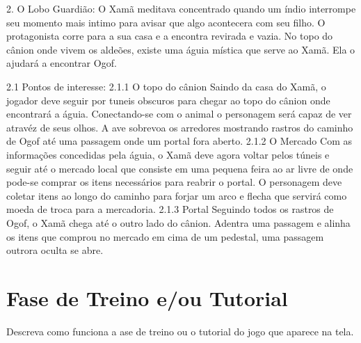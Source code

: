     2. O Lobo Guardião:
   O Xamã meditava concentrado quando um índio interrompe seu momento mais intimo para avisar que algo acontecera com seu filho. O protagonista corre para a sua casa e a encontra revirada e vazia. 
   No topo do cânion onde vivem os aldeões, existe uma águia mística que serve ao Xamã. Ela o ajudará a encontrar Ogof.
   
             2.1 Pontos de interesse: 
             	2.1.1 O topo do cânion
                	Saindo da casa do Xamã, o jogador deve seguir por tuneis obscuros para chegar ao topo do cânion onde encontrará a águia. Conectando-se com o animal o personagem será capaz de ver atravéz de seus olhos. A ave sobrevoa os arredores mostrando rastros do caminho de Ogof até uma passagem onde um portal fora aberto.
                 2.1.2 O Mercado
                 	Com as informações concedidas pela águia, o Xamã deve agora voltar pelos túneis e seguir até o mercado local que consiste em uma pequena feira ao ar livre de onde pode-se comprar os itens necessários para reabrir o portal. 
                    O personagem deve coletar itens ao longo do caminho para forjar um arco e flecha que servirá como moeda de troca para a mercadoria. 
               2.1.3 Portal
               	   Seguindo todos os rastros de Ogof, o Xamã chega até o outro lado do cânion. Adentra uma passagem e alinha os itens que comprou no mercado em cima de um pedestal, uma passagem outrora oculta se abre.

\section{Fase de Treino e/ou Tutorial}

Descreva como funciona a ase de treino ou o tutorial do jogo que aparece na tela.

